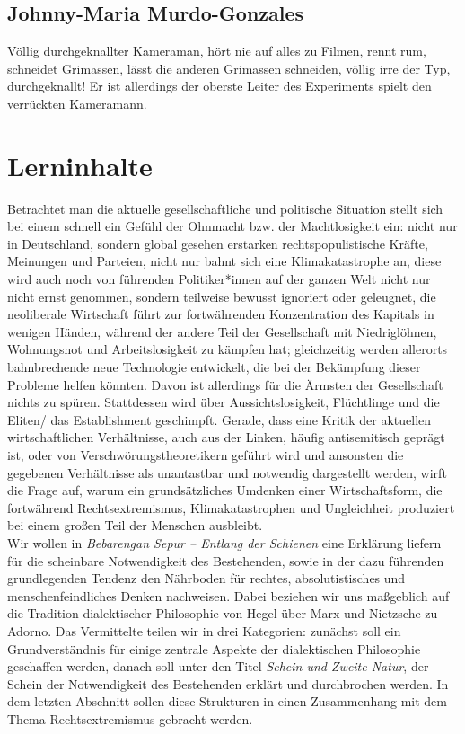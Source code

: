 \documentclass[a4paper, 12pt]{scrartcl}
\begin{document}
    \subsection{Johnny-Maria Murdo-Gonzales}
    Völlig durchgeknallter Kameraman, hört nie auf alles zu Filmen, rennt rum, schneidet Grimassen, lässt die anderen Grimassen schneiden, völlig irre der Typ, durchgeknallt! 
    Er ist allerdings der oberste Leiter des Experiments \glqq spielt\grqq{} den verrückten Kameramann. 

    \section{Lerninhalte}
    Betrachtet man die aktuelle gesellschaftliche und politische Situation stellt sich bei einem  schnell ein Gefühl der  Ohnmacht bzw. der Machtlosigkeit ein: nicht nur in Deutschland, sondern global gesehen erstarken rechtspopulistische Kräfte, Meinungen und Parteien, nicht nur bahnt sich eine Klimakatastrophe an, diese wird auch noch von führenden Politiker*innen auf der ganzen Welt nicht nur nicht ernst genommen, sondern teilweise bewusst ignoriert oder geleugnet, die neoliberale Wirtschaft führt zur fortwährenden Konzentration des Kapitals in wenigen Händen, während der andere Teil der Gesellschaft mit Niedriglöhnen, Wohnungsnot und Arbeitslosigkeit zu kämpfen hat; gleichzeitig werden allerorts bahnbrechende neue Technologie entwickelt, die bei der Bekämpfung dieser Probleme helfen könnten. 
    Davon ist allerdings für die Ärmsten der Gesellschaft nichts zu spüren. Stattdessen wird über Aussichtslosigkeit, Flüchtlinge und die Eliten/ das Establishment geschimpft. Gerade, dass eine Kritik der aktuellen wirtschaftlichen Verhältnisse, auch aus der Linken, häufig antisemitisch geprägt ist, oder von Verschwörungstheoretikern geführt wird und ansonsten die gegebenen Verhältnisse als unantastbar und notwendig dargestellt werden, wirft die Frage auf, warum ein grundsätzliches Umdenken einer Wirtschaftsform, die fortwährend Rechtsextremismus, Klimakatastrophen und Ungleichheit produziert bei einem großen Teil der Menschen ausbleibt. \\
    Wir wollen in \textit{Bebarengan Sepur – Entlang der Schienen} eine Erklärung liefern für die scheinbare Notwendigkeit des Bestehenden, sowie in der dazu führenden grundlegenden Tendenz den Nährboden für rechtes, absolutistisches und menschenfeindliches Denken nachweisen. 
    Dabei beziehen wir uns maßgeblich auf die Tradition dialektischer Philosophie von Hegel über Marx und Nietzsche zu Adorno. 
    Das Vermittelte teilen wir in drei Kategorien: zunächst soll ein Grundverständnis für einige zentrale Aspekte der dialektischen Philosophie geschaffen werden, danach soll unter den Titel \textit{Schein und Zweite Natur}, der Schein der Notwendigkeit des Bestehenden erklärt und durchbrochen werden. 
    In dem letzten Abschnitt sollen diese Strukturen in einen Zusammenhang mit dem Thema Rechtsextremismus gebracht werden.
\end{document}
